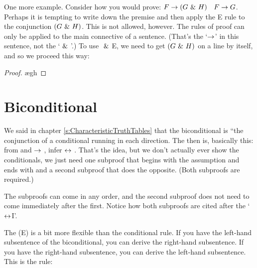 One more example. Consider how you would prove: $F\rightarrow(G~\&~ H)$ \therefore\ $F\rightarrow G$. Perhaps it is tempting to write down the premise and then apply the {\eand}E rule to the conjunction $(G ~\&~ H)$. This is not allowed, however. The rules of proof can only be applied to the main connective of a sentence. (That's the `$\rightarrow$' in this sentence, not the `$~\&~$'.) To use $~\&~$E, we need to get $(G ~\&~ H)$ on a line by itself, and so we proceed this way:

\begin{proof}
	 
	\open
		\ae{gh}
	\close
\end{proof}


\section{Biconditional}
We said in chapter \ref{s:CharacteristicTruthTables} that the biconditional is ``the conjunction of a conditional running in each direction. The  then is, basically this: from  \eif  {} and  $\rightarrow$ , infer  $\leftrightarrow$ . That's the idea, but we don't actually ever show the conditionals, we just need one subproof that begins with the assumption  and ends with  and a second subproof that does the opposite. (Both subproofs are required.)

The subproofs can come in any order, and the second subproof does not need to come immediately after the first. Notice how both subproofs are cited after the `$\leftrightarrow$I'.

The  ({\eiff}E) is a bit more flexible than the conditional rule. If you have the left-hand subsentence of the biconditional, you can derive the right-hand subsentence. If you have the right-hand subsentence, you can derive the left-hand subsentence. This is the rule:
\factoidbox{
\begin{proof}
	\have[m]{ab}{\meta{A}\eiff\meta{B}}
	\have[n]{a}{\meta{A}}
	\have[\ ]{b}{\meta{B}} \be{ab,a}
\end{proof}
\begin{proof}
	\have[m]{ab}{\meta{A}\eiff\meta{B}}
	\have[n]{a}{\meta{B}}
	\have[\ ]{b}{\meta{A}} \be{ab,a}
\end{proof}}


